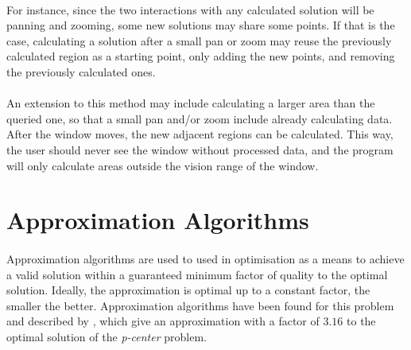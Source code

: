 \paragraph{}
For instance, since the two interactions with any calculated solution will be panning and zooming, some new solutions may share some points. If that is the case, calculating a solution after a small pan or zoom may reuse the previously calculated region as a starting point, only adding the new points, and removing the previously calculated ones.
\paragraph{}
An extension to this method may include calculating a larger area than the queried one, so that a small pan and/or zoom include already calculating data. After the window moves, the new adjacent regions can be calculated. This way, the user should never see the window without processed data, and the program will only calculate areas outside the vision range of the window.
\section {Approximation Algorithms}
\paragraph{}
Approximation algorithms are used to used in optimisation as a means to achieve a valid solution within a guaranteed minimum factor of quality to the optimal solution. Ideally, the approximation is optimal up to a constant factor, the smaller the better. Approximation algorithms have been found for this problem and described by \citet{approx}, which give an approximation with a factor of $3.16$ to the optimal solution of the \emph{p-center} problem.

%
%
%
